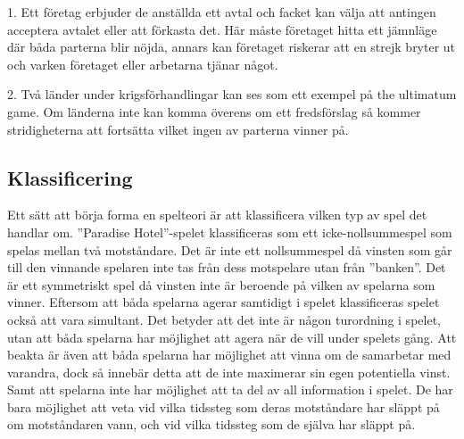 1. Ett företag erbjuder de anställda ett avtal och facket kan välja att antingen acceptera avtalet eller att förkasta det. Här måste företaget hitta ett jämnläge där båda parterna blir nöjda, annars kan företaget riskerar att en strejk bryter ut och varken företaget eller arbetarna tjänar något. 

2. Två länder under krigsförhandlingar kan ses som ett exempel på the ultimatum game. Om länderna inte kan komma överens om ett fredsförslag så kommer stridigheterna att fortsätta vilket ingen av parterna vinner på.~\cite{UltimatumGame}



\subsection{Klassificering}
Ett sätt att börja forma en spelteori är att klassificera vilken typ av spel det handlar om. ”Paradise Hotel”-spelet klassificeras som ett icke-nollsummespel som spelas mellan två motståndare. Det är inte ett nollsummespel då vinsten som går till den vinnande spelaren inte tas från dess motspelare utan från ”banken”. Det är ett symmetriskt spel då vinsten inte är beroende på vilken av spelarna som vinner. Eftersom att båda spelarna agerar samtidigt i spelet klassificeras spelet också att vara simultant. Det betyder att det inte är någon turordning i spelet, utan att båda spelarna har möjlighet att agera när de vill under spelets gång. Att beakta är även att båda spelarna har möjlighet att vinna om de samarbetar med varandra, dock så innebär detta att de inte maximerar sin egen potentiella vinst. Samt att spelarna inte har möjlighet att ta del av all information i spelet. De har bara möjlighet att veta vid vilka tidssteg som deras motståndare har släppt på om motståndaren vann, och vid vilka tidssteg som de själva har släppt på.